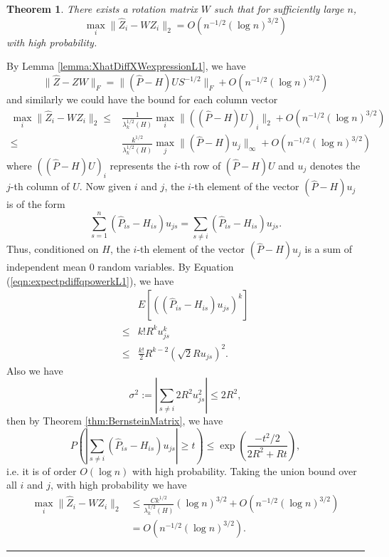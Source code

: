 \documentclass[a4paper]{article}
\newenvironment{proof}{{\bf Proof:  }}{\hfill\rule{2mm}{2mm}}
\newtheorem{theorem}[fact]{Theorem}
\begin{document}
\begin{theorem}
\label{thm:XhatDiffXWL1}
There exists a rotation matrix $W$ such that for sufficiently large $n$,
\[
	\max_i \| \hat{Z}_i - W Z_i \|_2 = O(n^{-1/2} (\log n)^{3/2})
\]
with high probability.
\end{theorem}
\begin{proof}
By Lemma \ref{lemma:XhatDiffXWexpressionL1}, we have
\[
	\|\hat{Z} - Z W\|_F = \| (\hat{P} - H) U S^{-1/2} \|_F + O(n^{-1/2} (\log n)^{3/2})
\]
and similarly we could have the bound for each column vector
\begin{align*}
	\max_i \| \hat{Z}_i - W Z_i \|_2
    \le & \frac{1}{\lambda_k^{1/2}(H)} \max_i \| ((\hat{P} - H) U)_i \|_2 + O(n^{-1/2} (\log n)^{3/2}) \\
    \le & \frac{k^{1/2}}{\lambda_k^{1/2}(H)} \max_j \| (\hat{P} - H) u_j \|_{\infty} + O(n^{-1/2} (\log n)^{3/2})
\end{align*}
where $((\hat{P} - H) U)_i$ represents the $i$-th row of $(\hat{P} - H) U$ and $u_j$ denotes the $j$-th column of $U$. Now given $i$ and $j$, the $i$-th element of the vector $(\hat{P} - H) u_j$ is of the form
\[
	\sum_{s=1}^n (\hat{P}_{is} - H_{is}) u_{js} = \sum_{s \ne i} (\hat{P}_{is} - H_{is}) u_{js}.
\]
Thus, conditioned on $H$, the $i$-th element of the vector $(\hat{P} - H) u_j$ is a sum of independent mean 0 random variables.
By Equation (\ref{eqn:expectpdiffqpowerkL1}), we have
\begin{align*}
	& E\left[\left((\hat{P}_{is} - H_{is}) u_{js}\right)^k\right] \\ 
    \le & k! R^k u_{js}^k \\
    \le & \frac{k!}{2} R^{k-2} (\sqrt{2} R u_{js})^2.
\end{align*}
Also we have
\[
	\sigma^2 := |\sum_{s \ne i} 2 R^2 u_{js}^2| \le 2 R^2,
\]
then by Theorem \ref{thm:BernsteinMatrix}, we have
\[
	P \left( \left| \sum_{s \ne i} (\hat{P}_{is} - H_{is}) u_{js} \right| \ge t \right)
    \le \exp \left( \frac{-t^2/2}{2 R^2 + R t} \right),
\]
i.e. it is of order $O(\log n)$ with high probability.
Taking the union bound over all $i$ and $j$, with high probability we have
\begin{align*}
	\max_i \| \hat{Z}_i - W Z_i \|_2
    & \le \frac{C k^{1/2}}{\lambda_k^{1/2}(H)} (\log n)^{3/2} + O(n^{-1/2} (\log n)^{3/2}) \\
    & = O(n^{-1/2} (\log n)^{3/2}).
\end{align*}
\end{proof}
\end{document}
